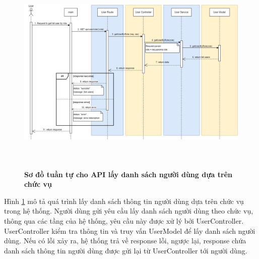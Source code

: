 \begin{figure}[H]
  \centering
  \includegraphics[width=16cm,height=10cm]{Images/sequence_api/getUserByRole.png}
  \caption[Sơ đồ tuần tự cho API lấy danh sách người dùng dựa trên chức vụ ]{\bfseries \fontsize{12pt}{0pt}
  \selectfont Sơ đồ tuần tự cho API lấy danh sách người dùng dựa trên chức vụ }
  \label{getUserByRole} %
\end{figure}
Hình \ref{getUserByRole} mô tả quá trình lấy danh sách thông tin người dùng dựa trên chức vụ trong hệ thống. Người dùng gửi yêu cầu lấy danh sách người dùng theo chức vụ, thông qua các tầng của hệ thống, yêu cầu này được xử lý bởi UserController. UserController kiểm tra thông tin và truy vấn UserModel để lấy danh sách người dùng. 
Nếu có lỗi xảy ra, hệ thống trả về response lỗi, ngược lại, response chứa danh sách thông tin người dùng được gửi lại từ UserController tới người dùng.

